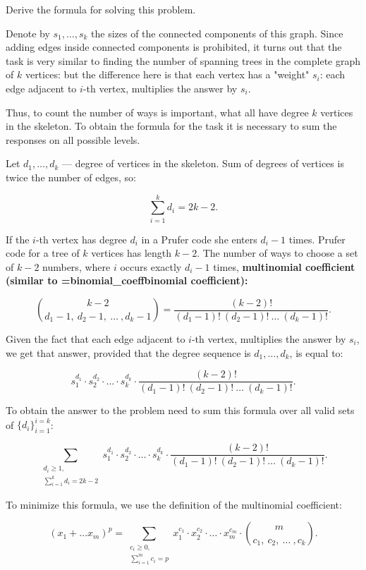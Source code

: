 Derive the formula for solving this problem.

Denote by $s_1, \ldots, s_k$ the sizes of the connected components of this graph. Since adding edges inside connected components is prohibited, it turns out that the task is very similar to finding the number of spanning trees in the complete graph of $k$ vertices: but the difference here is that each vertex has a "weight" $s_i$: each edge adjacent to $i$-th vertex, multiplies the answer by $s_i$.

Thus, to count the number of ways is important, what all have degree $k$ vertices in the skeleton. To obtain the formula for the task it is necessary to sum the responses on all possible levels.

Let $d_1, \ldots, d_k$ --- degree of vertices in the skeleton. Sum of degrees of vertices is twice the number of edges, so:

$$ \sum_{i=1}^k d_i = 2k-2. $$

If the $i$-th vertex has degree $d_i$ in a Prufer code she enters $d_i-1$ times. Prufer code for a tree of $k$ vertices has length $k-2$. The number of ways to choose a set of $k-2$ numbers, where $i$ occurs exactly $d_i-1$ times, \bf{multinomial coefficient} (similar to \algohref=binomial_coeff{binomial coefficient}):

$$ \binom{ k-2 }{ d_1-1, ~ d_2-1, ~ \ldots ~ , d_k-1 } = \frac{ (k-2)! }{ (d_1-1)! ~ (d_2-1)! ~ \ldots ~ (d_k-1)! }. $$

Given the fact that each edge adjacent to $i$-th vertex, multiplies the answer by $s_i$, we get that answer, provided that the degree sequence is $d_1, \ldots, d_k$, is equal to:

$$ s_1^{d_1} \cdot s_2^{d_2} \cdot \ldots \cdot s_k^{d_k} \cdot \frac{ (k-2)! }{ (d_1-1)! ~ (d_2-1)! ~ \ldots ~ (d_k-1)! }. $$

To obtain the answer to the problem need to sum this formula over all valid sets of $\{ d_i \}_{i=1}^{i=k}$:

$$ \sum_{ \substack{ d_i \ge 1, \\ \sum_{i=1}^k d_i = 2k-2 } } s_1^{d_1} \cdot s_2^{d_2} \cdot \ldots \cdot s_k^{d_k} \cdot \frac{ (k-2)! }{ (d_1-1)! ~ (d_2-1)! ~ \ldots ~ (d_k-1)! }. $$

To minimize this formula, we use the definition of the multinomial coefficient:

$$ (x_1 + \ldots x_m)^p = \sum_{ \substack{ c_i \ge 0, \\ \sum_{i=1}^{m} c_i = p } } x_1^{c_1} \cdot x_2^{c_2} \cdot \ldots \cdot x_m^{c_m} \cdot \binom{ m }{ c_1, ~ c_2, ~ \ldots ~ , c_k }. $$


